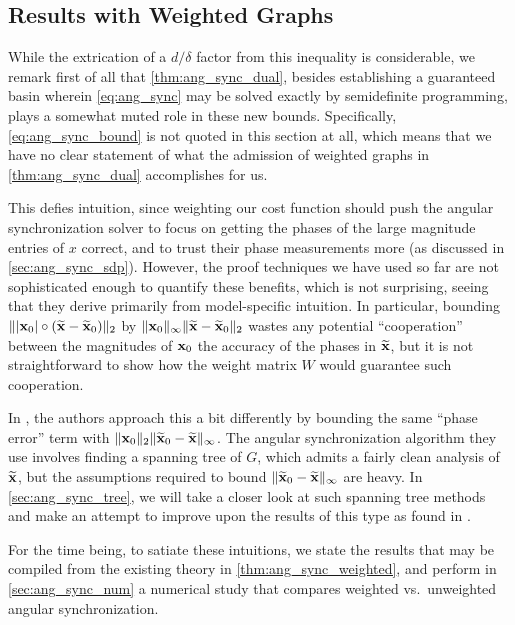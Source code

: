 \subsection{Results with Weighted Graphs}
\label{sec:weighted_graph}
While the extrication of a $d / \delta$ factor from this inequality is considerable, we remark first of all that \cref{thm:ang_sync_dual}, besides establishing a guaranteed basin wherein \eqref{eq:ang_sync} may be solved exactly by semidefinite programming, plays a somewhat muted role in these new bounds.  Specifically, \eqref{eq:ang_sync_bound} is not quoted in this section at all, which means that we have no clear statement of what the admission of weighted graphs in \cref{thm:ang_sync_dual} accomplishes for us.

This defies intuition, since weighting our cost function should push the angular synchronization solver to focus on getting the phases of the large magnitude entries of $x$ correct, and to trust their phase measurements more (as discussed in \cref{sec:ang_sync_sdp}).  However, the proof techniques we have used so far are not sophisticated enough to quantify these benefits, which is not surprising, seeing that they derive primarily from model-specific intuition.  In particular, bounding $\lVert|\mathbf x_0| \circ (\widetilde{\mathbf x} - \widetilde{\mathbf x}_0)\rVert_2$ by $\lVert\mathbf x_0\rVert_\infty \lVert\widetilde{\mathbf x} - \widetilde{\mathbf x}_0\rVert_2$ wastes any potential ``cooperation'' between the magnitudes of $\mathbf x_0$ the accuracy of the phases in $\widetilde{\mathbf x}$, but it is not straightforward to show how the weight matrix $W$ would guarantee such cooperation.

In \cite{IVW2015_FastPhase}, the authors approach this a bit differently by bounding the same ``phase error'' term with $\lVert\mathbf x_0\rVert_2 \lVert\widetilde{\mathbf x}_0 - \widetilde{\mathbf x}\rVert_\infty$.  The angular synchronization algorithm they use involves finding a spanning tree of $G$, which admits a fairly clean analysis of $\widetilde{\mathbf x}$, but the assumptions required to bound $\lVert\widetilde{\mathbf x}_0 - \widetilde{\mathbf x}\rVert_\infty$ are heavy.  In \cref{sec:ang_sync_tree}, we will take a closer look at such spanning tree methods and make an attempt to improve upon the results of this type as found in \cite{IVW2015_FastPhase}.

For the time being, to satiate these intuitions, we state the results that may be compiled from the existing theory in \cref{thm:ang_sync_weighted}, and perform in \cref{sec:ang_sync_num} a numerical study that compares weighted vs.~unweighted angular synchronization.

